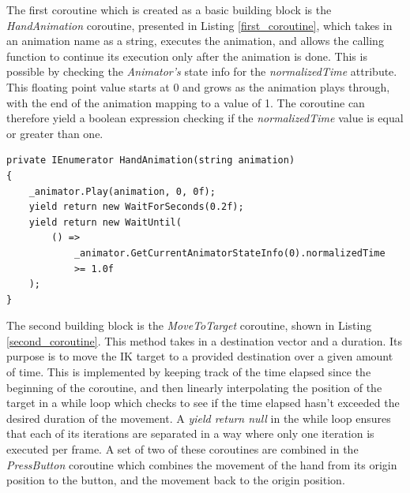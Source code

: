The first coroutine which is created as a basic building block is the
\textit{HandAnimation} coroutine, presented in Listing \ref{first_coroutine},
which takes in an animation name as a string, executes the animation, and allows
the calling function to continue its execution only after the animation is done.
This is possible by checking the \textit{Animator's} state info for the
\textit{normalizedTime} attribute. This floating point value starts at 0 and
grows as the animation plays through, with the end of the animation mapping to
a value of 1. The coroutine can therefore yield a boolean expression checking if
the \textit{normalizedTime} value is equal or greater than one. 

\begin{lstlisting}[basicstyle=\linespread{0.9}\footnotesize\ttfamily, numbers=none,frame=single,
caption={A coroutine which plays a designated animation and relinquishes control
to the main loop once the animation is finished. \textit{IKPressButton.cs}},captionpos=t,
label=first_coroutine, language={[Sharp]c}, float=tp]
private IEnumerator HandAnimation(string animation)
{
    _animator.Play(animation, 0, 0f);
    yield return new WaitForSeconds(0.2f);
    yield return new WaitUntil(
        () =>
            _animator.GetCurrentAnimatorStateInfo(0).normalizedTime
            >= 1.0f
    );
}
\end{lstlisting}

The second building block is the \textit{MoveToTarget} coroutine, shown in
Listing \ref{second_coroutine}. This method
takes in a destination vector and a duration. Its purpose is to move the IK
target to a provided destination over a given amount of time. This is
implemented by keeping track of the time elapsed since the beginning of the
coroutine, and then linearly interpolating the position of the target
in a while loop which checks to see if the time elapsed hasn't exceeded the
desired duration of the movement. A \textit{yield return null} in the while loop
ensures that each of its iterations are separated in a way where only one
iteration is executed per frame. A set of two of these coroutines are combined
in the \textit{PressButton} coroutine which combines the movement of the hand
from its origin position to the button, and the movement back to the origin
position.

